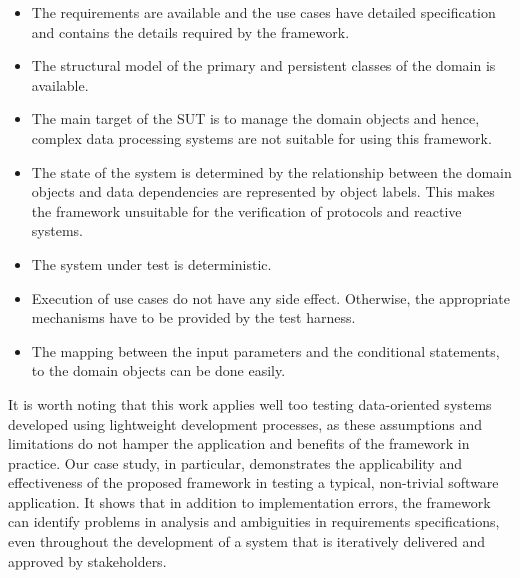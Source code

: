 \begin{itemize}
	\item The requirements are available and the use cases have detailed specification and contains the details required by the framework.
	
	\item The structural model of the primary and persistent classes of the domain is available.
	
	\item  The main target of the SUT is to manage the domain objects and hence, complex data processing systems are not suitable for using this framework.
	
	\item The state of the system is determined by the relationship between the domain objects and data dependencies are represented by object labels. This makes the framework unsuitable for the verification of protocols and reactive systems. 
	
	\item The system under test is deterministic.
	
	\item Execution of use cases do not have any side effect. Otherwise, the appropriate mechanisms have to be provided by the test harness.
	
	\item The mapping between the input parameters and the conditional statements, to the domain objects can be done easily.
\end{itemize}

It is worth noting that this work applies well too testing data-oriented systems developed using lightweight development processes, as these assumptions and limitations do not hamper the application and benefits of the framework in practice. Our case study, in particular, demonstrates the applicability and effectiveness of the proposed framework in testing a typical, non-trivial software application. It shows that in addition to implementation errors, the framework can identify problems in analysis and ambiguities in requirements specifications, even throughout the development of a system that is iteratively delivered and approved by stakeholders.